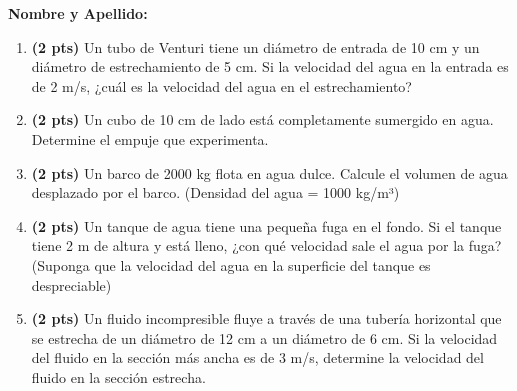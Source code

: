 \documentclass[a4paper,10pt]{article}
\begin{document}
\begin{minipage}[t]{0.45\textwidth}
    \begin{center}

        \textbf{Nombre y Apellido: \underline{\hspace{4cm}}}
    \end{center}

    \begin{enumerate}
        \item \textbf{(2 pts)} Un tubo de Venturi tiene un diámetro de entrada de 10 cm y un diámetro de estrechamiento de 5 cm. Si la velocidad del agua en la entrada es de 2 m/s, ¿cuál es la velocidad del agua en el estrechamiento?

        \item \textbf{(2 pts)} Un cubo de 10 cm de lado está completamente sumergido en agua. Determine el empuje que experimenta.

      \item \textbf{(2 pts)} Un barco de 2000 kg flota en agua dulce. Calcule el volumen de agua desplazado por el barco. (Densidad del agua = 1000 kg/m³)
        \item \textbf{(2 pts)} Un tanque de agua tiene una pequeña fuga en el fondo. Si el tanque tiene 2 m de altura y está lleno, ¿con qué velocidad sale el agua por la fuga? (Suponga que la velocidad del agua en la superficie del tanque es despreciable)
        
        \item \textbf{(2 pts)} Un fluido incompresible fluye a través de una tubería horizontal que se estrecha de un diámetro de 12 cm a un diámetro de 6 cm. Si la velocidad del fluido en la sección más ancha es de 3 m/s, determine la velocidad del fluido en la sección estrecha.
        
    
    \end{enumerate}
\end{minipage}
\end{document}
